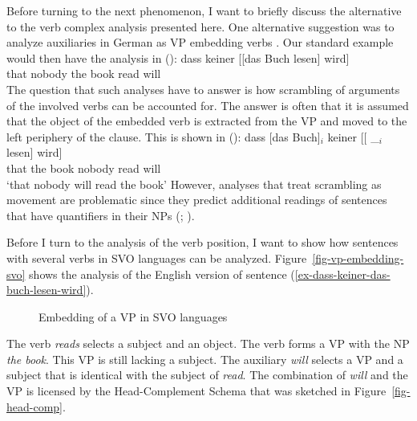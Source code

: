 Before turning to the next phenomenon, I want to briefly discuss the alternative to the verb complex
analysis presented here. One alternative suggestion was to analyze auxiliaries in German as VP
embedding verbs \citep{Wurmbrand2003b}. Our standard example would then have the analysis in ():
\ea
\gll dass keiner [[das Buch lesen] wird]\\
     that nobody \hphantom{[[}the book read will\\
\z
The question that such analyses have to answer is how scrambling of arguments of the involved verbs
can be accounted for. The answer is often that it is assumed that the object of the embedded verb is
extracted from the VP and moved to the left periphery of the clause. This is shown in ():
\ea
\gll dass [das Buch]$_i$ keiner [[ \_$_i$ lesen] wird]\\
     that \spacebr{}the book nobody {} {} read will\\
\glt `that nobody will read the book'
\z
However, analyses that treat scrambling as movement are problematic since they predict additional
readings of sentences that have quantifiers in their NPs (\citealp[]{Kiss2001a}; \citealp[Section~2.6]{Fanselow2001a}).


Before I turn to the analysis of the verb position, I want to show how sentences with several verbs
\label{page-English-Aux-VPs}
in SVO languages can be analyzed. Figure~\vref{fig-vp-embedding-svo} shows the analysis of the English version of sentence
(\ref{ex-dass-keiner-das-buch-lesen-wird}).
\begin{figure}
\caption{\label{fig-vp-embedding-svo}Embedding of a VP in SVO languages}
\end{figure}
The verb \emph{reads} selects a subject and an object. The verb forms a VP with the NP \emph{the
  book}. This VP is still lacking a subject. The auxiliary \emph{will} selects a VP and a subject
that is identical with the subject of \emph{read}. The combination of \emph{will} and the VP is
licensed by the Head-Complement Schema that was sketched in Figure~\vref{fig-head-comp}.

